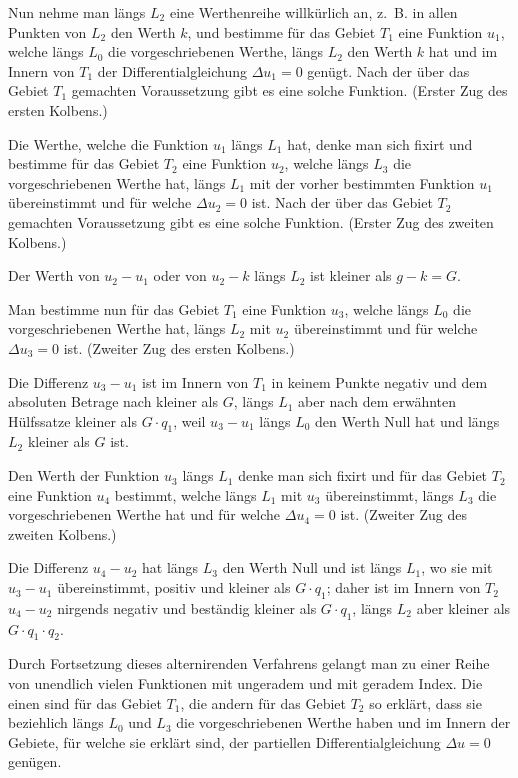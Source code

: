 \documentclass{article}
\begin{document}
Nun nehme man längs $L_2$ eine Werthenreihe willkürlich an, z.~B. in allen Punkten von $L_2$ den Werth $k$, und bestimme für das Gebiet $T_1$ eine Funktion $u_1$, welche längs $L_0$ die vorgeschriebenen Werthe, längs $L_2$ den Werth $k$ hat und im Innern von $T_1$ der Differentialgleichung $\Delta u_1 = 0$ genügt. Nach der über das Gebiet $T_1$ gemachten Voraussetzung gibt es eine solche Funktion. (Erster Zug des ersten Kolbens.)

Die Werthe, welche die Funktion $u_1$ längs $L_1$ hat, denke man sich fixirt und bestimme für das
Gebiet $T_2$ eine Funktion $u_2$, welche längs $L_3$ die vorgeschriebenen Werthe hat, längs $L_1$ mit der vorher bestimmten Funktion $u_1$ übereinstimmt und für welche $\Delta u_2 = 0$ ist. Nach der über das Gebiet $T_2$ gemachten Voraussetzung gibt es eine solche Funktion. (Erster Zug des zweiten Kolbens.)

Der Werth von $u_2 - u_1$ oder von $u_2 - k$ längs $L_2$ ist kleiner als $g - k = G$.

Man bestimme nun für das Gebiet $T_1$ eine Funktion $u_3$, welche längs $L_0$ die vorgeschriebenen Werthe hat, längs $L_2$ mit $u_2$ übereinstimmt und für welche $\Delta u_3 = 0$ ist. (Zweiter Zug des ersten Kolbens.)

Die Differenz $u_3 - u_1$ ist im Innern von $T_1$ in keinem Punkte negativ und dem absoluten Betrage nach kleiner als $G$, längs $L_1$ aber nach dem erwähnten Hülfssatze kleiner als $G \cdot q_1$, weil $u_3 - u_1$ längs $L_0$ den Werth Null hat und längs $L_2$ kleiner als $G$ ist.

Den Werth der Funktion $u_3$ längs $L_1$ denke man sich fixirt und für das Gebiet $T_2$ eine Funktion $u_4$ bestimmt, welche längs $L_1$ mit $u_3$ übereinstimmt, längs $L_3$ die vorgeschriebenen Werthe hat und für welche $\Delta u_4 = 0$ ist. (Zweiter Zug des zweiten Kolbens.)

Die Differenz $u_4 - u_2$ hat längs $L_3$ den Werth Null und ist längs $L_1$, wo sie mit $u_3 - u_1$ übereinstimmt, positiv und kleiner als $G \cdot q_1$; daher ist im Innern von $T_2$ $u_4 - u_2$ nirgends negativ und beständig kleiner als $G \cdot q_1$, längs $L_2$ aber kleiner als $G \cdot q_1 \cdot q_2$.

Durch Fortsetzung dieses alternirenden Verfahrens gelangt man zu einer Reihe von unendlich vielen Funktionen mit ungeradem und mit geradem Index. Die einen sind für das Gebiet $T_1$, die andern für das Gebiet $T_2$ so erklärt, dass sie beziehlich längs
$L_0$ und $L_3$ die vorgeschriebenen Werthe haben und im Innern der Gebiete, für welche sie erklärt sind, der partiellen Differentialgleichung $\Delta u = 0$ genügen.
\end{document}
